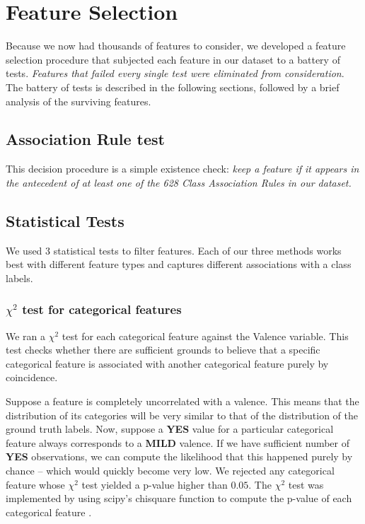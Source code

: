 \chapter{Feature Selection}\label{sec:selection}

Because we now had thousands of features to consider, we developed a
feature selection procedure that subjected each feature in our dataset to a battery of tests. \textit{Features that failed
every single  test were eliminated from consideration}.  
The battery of tests is described in the following sections, followed by a brief analysis of the surviving features.

\section{Association Rule test} This decision procedure is a simple existence check: \textit{keep a feature if it
appears in the antecedent of at least one of the 628 Class Association Rules
in our dataset.}

\section{Statistical Tests}

We used 3 statistical tests to filter features. Each of our three methods works best with different feature types and captures different associations with a class labels.

\subsection{$\chi^2$ test for categorical features}
We ran a $\chi^2$ test \cite{chisquare} for each categorical feature against the
\textsf{Valence} variable.  This test checks whether there are sufficient
grounds to believe that a specific categorical feature is associated
with another categorical feature purely by coincidence.  

Suppose a feature is completely uncorrelated with a valence. This means
that the distribution of its categories will be very similar to that of 
the distribution of the ground truth labels. Now, suppose a \textbf{YES} value for a particular categorical feature always corresponds to a \textbf{MILD} valence. If we have sufficient number of \textbf{YES} observations, we can compute the likelihood that this happened purely by chance -- which would quickly become very low. We
 rejected any 
categorical feature whose $\chi^2$ test yielded a p-value higher than $0.05$.
The $\chi^2$ test was implemented by using \textsf{scipy}'s
\textsf{chisquare} function to compute the p-value of each categorical feature \cite{scipy}.


